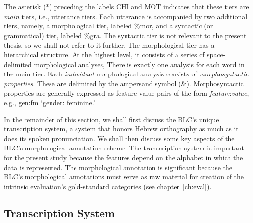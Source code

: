 The asterisk (*) preceding the labels CHI and \textsf{MOT} 
indicates that these tiers are \emph{main} tiers, i.e.,  
utterance tiers. Each utterance is accompanied by two 
additional tiers, 
namely, a morphological tier, labeled \textsf{\%mor}, 
and a syntactic (or grammatical) tier, labeled \textsf{\%gra}. 
The syntactic tier is not relevant to the present thesis,
so we shall not refer to it further. The morphological tier 
has a hierarchical structure. At the highest level, it consists of a 
series of space-delimited morphological analyses, 
There is exactly one analysis for each word in the main tier.  
Each \emph{individual} morphological analysis consists
of \textit{morphosyntactic properties}. These are delimited by the 
ampersand symbol (\textsf{\&}). Morphosyntactic properties are 
generally expressed as feature-value pairs of the 
form \textsf{\textit{feature}:\textit{value}}, e.g., 
\textsf{gen:fm} `gender: feminine.' 

In the remainder of this section, we shall first discuss the 
BLC's unique transcription system, a system that 
honors Hebrew orthography as much as it does its spoken 
pronunciation. We shall then discuss some key aspects of 
the BLC's morphological annotation scheme. The 
transcription system is important for the present study 
because the features
depend on the alphabet in which the data is represented.
 The morphological annotation 
is significant because  the BLC's morphological annotations must 
serve as raw material for creation of  the intrinsic evaluation's 
gold-standard categories (see chapter~\ref{ch:eval}). 

\subsection{Transcription System}
\label{sec:transcription}

